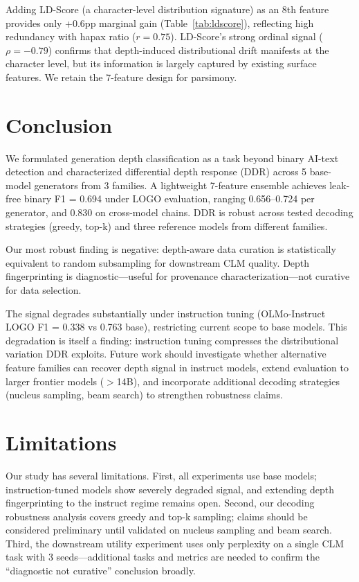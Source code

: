 \documentclass[11pt,a4paper]{article}
\begin{document}
Adding LD-Score (a character-level distribution signature) as an 8th feature provides only +0.6pp marginal gain (Table~\ref{tab:ldscore}), reflecting high redundancy with hapax ratio ($r = 0.75$). LD-Score's strong ordinal signal ($\rho = -0.79$) confirms that depth-induced distributional drift manifests at the character level, but its information is largely captured by existing surface features. We retain the 7-feature design for parsimony.

\section{Conclusion}
\label{sec:conclusion}

We formulated generation depth classification as a task beyond binary AI-text detection and characterized differential depth response (DDR) across 5 base-model generators from 3 families. A lightweight 7-feature ensemble achieves leak-free binary F1 = 0.694 under LOGO evaluation, ranging 0.656--0.724 per generator, and 0.830 on cross-model chains. DDR is robust across tested decoding strategies (greedy, top-k) and three reference models from different families.

Our most robust finding is negative: depth-aware data curation is statistically equivalent to random subsampling for downstream CLM quality. Depth fingerprinting is diagnostic---useful for provenance characterization---not curative for data selection.

The signal degrades substantially under instruction tuning (OLMo-Instruct LOGO F1 = 0.338 vs 0.763 base), restricting current scope to base models. This degradation is itself a finding: instruction tuning compresses the distributional variation DDR exploits. Future work should investigate whether alternative feature families can recover depth signal in instruct models, extend evaluation to larger frontier models ($>$14B), and incorporate additional decoding strategies (nucleus sampling, beam search) to strengthen robustness claims.

\section*{Limitations}

Our study has several limitations. First, all experiments use base models; instruction-tuned models show severely degraded signal, and extending depth fingerprinting to the instruct regime remains open. Second, our decoding robustness analysis covers greedy and top-k sampling; claims should be considered preliminary until validated on nucleus sampling and beam search. Third, the downstream utility experiment uses only perplexity on a single CLM task with 3 seeds---additional tasks and metrics are needed to confirm the ``diagnostic not curative'' conclusion broadly.


\end{document}
